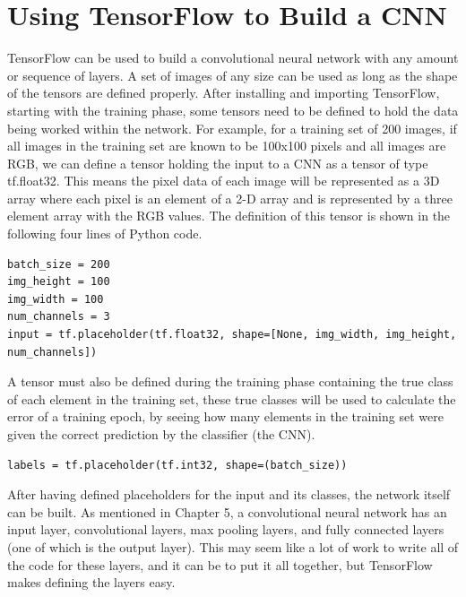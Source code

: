 \documentclass[12pt]{report} %
\begin{document}
\section{Using TensorFlow to Build a CNN}
	TensorFlow can be used to build a convolutional neural network with any amount or sequence of layers. A set of images of any size can be used as long as the shape of the tensors are defined properly. After installing and importing TensorFlow, starting with the training phase, some tensors need to be defined to hold the data being worked within the network. For example, for a training set of 200 images, if all images in the training set are known to be 100x100 pixels and all images are RGB, we can define a tensor holding the input to a CNN as a tensor of type tf.float32. This means the pixel data of each image will be represented as a 3D array where each pixel is an element of a 2-D array and is represented by a three element array with the RGB values. The definition of this tensor is shown in the following four lines of Python code.
 \lstset{xleftmargin=10pt,xrightmargin=10pt}
\begin{lstlisting}
batch_size = 200
img_height = 100
img_width = 100
num_channels = 3
input = tf.placeholder(tf.float32, shape=[None, img_width, img_height, num_channels])
\end{lstlisting}

	A tensor must also be defined during the training phase containing the true class of each element in the training set, these true classes will be used to calculate the error of a training epoch, by seeing how many elements in the training set were given the correct prediction by the classifier (the CNN).
\begin{lstlisting}
labels = tf.placeholder(tf.int32, shape=(batch_size))
\end{lstlisting}
	
	After having defined placeholders for the input and its classes, the network itself can be built. As mentioned in Chapter 5, a convolutional neural network has an input layer, convolutional layers, max pooling layers, and fully connected layers (one of which is the output layer). This may seem like a lot of work to write all of the code for these layers, and it can be to put it all together, but TensorFlow makes defining the layers easy. 
	
\end{document}
